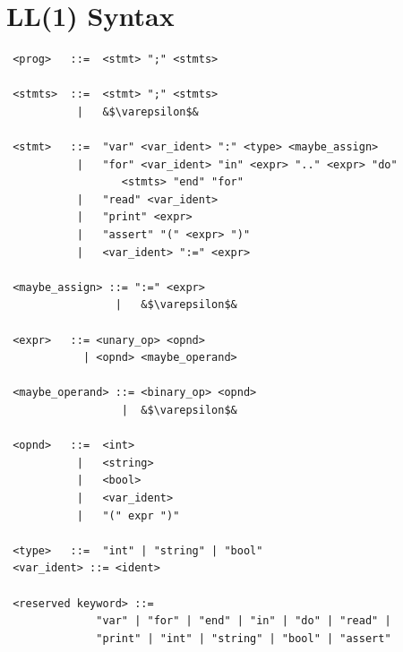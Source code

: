 \documentclass{article}
\begin{document}
\newpage

\section{LL(1) Syntax}

\begin{verbatim}
 <prog>   ::=  <stmt> ";" <stmts>

 <stmts>  ::=  <stmt> ";" <stmts>
           |   &$\varepsilon$&

 <stmt>   ::=  "var" <var_ident> ":" <type> <maybe_assign>
           |   "for" <var_ident> "in" <expr> ".." <expr> "do"
                  <stmts> "end" "for"
           |   "read" <var_ident>
           |   "print" <expr>
           |   "assert" "(" <expr> ")"
           |   <var_ident> ":=" <expr>

 <maybe_assign> ::= ":=" <expr>
                 |   &$\varepsilon$&

 <expr>   ::= <unary_op> <opnd>
            | <opnd> <maybe_operand>

 <maybe_operand> ::= <binary_op> <opnd>
                  |  &$\varepsilon$&

 <opnd>   ::=  <int>
           |   <string>
           |   <bool>
           |   <var_ident>
           |   "(" expr ")"

 <type>   ::=  "int" | "string" | "bool"
 <var_ident> ::= <ident>

 <reserved keyword> ::=
              "var" | "for" | "end" | "in" | "do" | "read" |
              "print" | "int" | "string" | "bool" | "assert"
\end{verbatim}

\newpage
\end{document}
